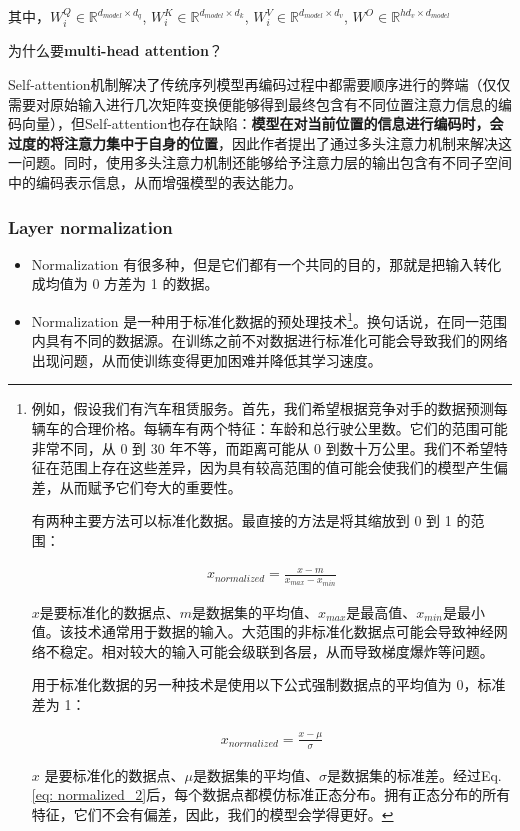 \documentclass[letterpaper,10pt]{article}
\begin{document}
	其中，$W_i^Q \in \mathbb{R}^{d_{model} \times d_q}$, $W_i^K \in \mathbb{R}^{d_{model} \times d_k}$, $W_i^V \in \mathbb{R}^{d_{model} \times d_v}$, $W^O \in \mathbb{R}^{hd_v \times d_{model}}$
	
	为什么要\textbf{multi-head attention}？
	
	Self-attention机制解决了传统序列模型再编码过程中都需要顺序进行的弊端（仅仅需要对原始输入进行几次矩阵变换便能够得到最终包含有不同位置注意力信息的编码向量），但Self-attention也存在缺陷：\textbf{模型在对当前位置的信息进行编码时，会过度的将注意力集中于自身的位置}，因此作者提出了通过多头注意力机制来解决这一问题。同时，使用多头注意力机制还能够给予注意力层的输出包含有不同子空间中的编码表示信息，从而增强模型的表达能力。
	
	\subsubsection{Layer normalization}
	
	\begin{itemize}
		\item {} Normalization 有很多种，但是它们都有一个共同的目的，那就是把输入转化成均值为 0 方差为 1 的数据。
		
		\item {} Normalization 是一种用于标准化数据的预处理技术\footnote{例如，假设我们有汽车租赁服务。首先，我们希望根据竞争对手的数据预测每辆车的合理价格。每辆车有两个特征：车龄和总行驶公里数。它们的范围可能非常不同，从 0 到 30 年不等，而距离可能从 0 到数十万公里。我们不希望特征在范围上存在这些差异，因为具有较高范围的值可能会使我们的模型产生偏差，从而赋予它们夸大的重要性。
		
		有两种主要方法可以标准化数据。最直接的方法是将其缩放到 0 到 1 的范围：
		
		\begin{equation}
			\begin{aligned}
				x_{normalized} = \frac{x-m}{x_{max}-x_{min}}
			\end{aligned}
			\label{eq: normalized_1}
		\end{equation}
		
		$x$是要标准化的数据点、$m$是数据集的平均值、$x_{max}$是最高值、$x_{min}$是最小值。该技术通常用于数据的输入。大范围的非标准化数据点可能会导致神经网络不稳定。相对较大的输入可能会级联到各层，从而导致梯度爆炸等问题。
		
		用于标准化数据的另一种技术是使用以下公式强制数据点的平均值为 0，标准差为 1：
		
		\begin{equation}
			\begin{aligned}
				x_{normalized} = \frac{x-\mu}{\sigma}
			\end{aligned}
			\label{eq: normalized_2}
		\end{equation}
		
		$x$ 是要标准化的数据点、$\mu$是数据集的平均值、$\sigma$是数据集的标准差。经过Eq.\ref{eq: normalized_2}后，每个数据点都模仿标准正态分布。拥有正态分布的所有特征，它们不会有偏差，因此，我们的模型会学得更好。
		}。换句话说，在同一范围内具有不同的数据源。在训练之前不对数据进行标准化可能会导致我们的网络出现问题，从而使训练变得更加困难并降低其学习速度。
	\end{itemize}
	
\end{document}
